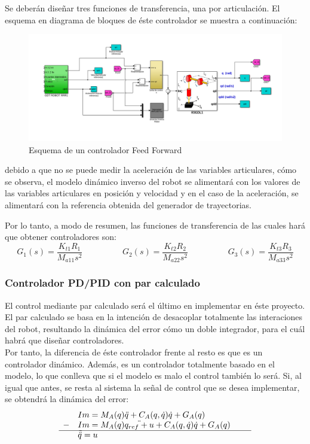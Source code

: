 Se deberán diseñar tres funciones de transferencia, una por articulación. El esquema en diagrama de bloques de éste controlador se muestra a continuación:

\begin{figure}[h!]
	\centering
	\includegraphics[width=.8\textwidth]{montaje_feedforward}
	\caption{Esquema de un controlador Feed Forward}
\end{figure}

debido a que no se puede medir la aceleración de las variables articulares, cómo se observa, el modelo dinámico inverso del robot se alimentará con los valores de las variables articulares en posición y velocidad y en el caso de la aceleración, se alimentará con la referencia obtenida del generador de trayectorias.

Por lo tanto, a modo de resumen, las funciones de transferencia de las cuales hará que obtener controladores son:
\begin{equation}
	G_{1}(s)=\frac{K_{t1}R_1}{M_{a11}s^{2}} \hspace{2cm} G_{2}(s)=\frac{K_{t2}R_2}{M_{a22}s^{2}} \hspace{2cm} G_{3}(s)=\frac{K_{t3}R_3}{M_{a33}s^{2}}
\end{equation}


	\subsubsection{Controlador PD/PID con par calculado}
	El control mediante par calculado será el último en implementar en éste proyecto. El par calculado se basa en la intención de desacoplar totalmente las interaciones del robot, resultando la dinámica del error cómo un doble integrador, para el cuál habrá que diseñar controladores. \\
	Por tanto, la diferencia de éste controlador frente al resto es que es un controlador dinámico. Además, es un controlador totalmente basado en el modelo, lo que conlleva que si el modelo es malo el control también lo será.
	Si, al igual que antes, se resta al sistema la señal de control que se desea implementar, se obtendrá la dinámica del error:
	\begin{equation}
		\begin{array}{llll}
		  & Im=M_{A}(q)\ddot{q} + C_{A}(q,\dot{q})\dot{q} + G_{A}(q) \\
		- & Im=M_{A}(q)\ddot{q_{ref}+u} + C_{A}(q,\dot{q})\dot{q} + G_{A}(q) \\
		\cline{1-4}
		\vspace{0.2cm}
		  & \tilde{\ddot{q}} = u & &
		\end{array}
	\end{equation}

